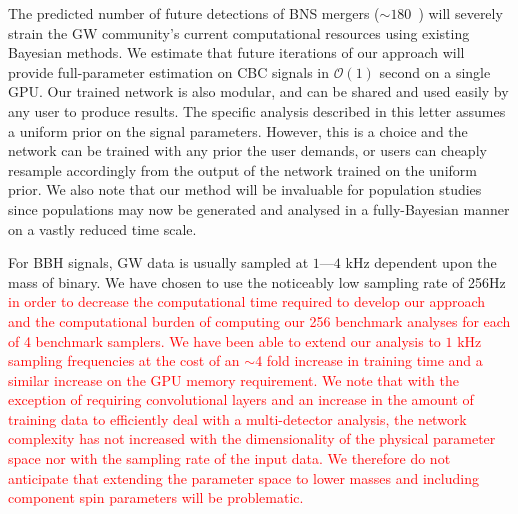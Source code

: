 \documentclass[%
showpacs,
nofootinbib,
 amsmath,amssymb,
 aps,
 twocolumn,
 prl,
 reprint,
floatfix,
]{revtex4-1}
\newcommand{\new}[1]{\textcolor{red}{#1}}
\begin{document}
%
%
The predicted number of future detections of \ac{BNS} mergers ($\sim
180$~\cite{2018LRR....21....3A}) will severely strain the \ac{GW} community's
current computational resources using existing Bayesian methods. We estimate
that future iterations of our approach will provide full-parameter estimation
on \ac{CBC} signals in $\mathcal{O}(1)$ second on a single \ac{GPU}. Our
trained network is also modular, and can be shared and used easily by any user
to produce results. The specific analysis described in this letter assumes a
uniform prior on the signal parameters. However, this is a choice and the
network can be trained with any prior the user demands, or users can cheaply
resample accordingly from the output of the network trained on the uniform
prior. We also note that our method will be invaluable for population studies
since populations may now be generated and analysed in a fully-Bayesian manner
on a vastly reduced time scale. 

%
%
For \ac{BBH} signals, \ac{GW} data is usually sampled at $1$---$4$ kHz
dependent upon the mass of binary. We have chosen to use the noticeably low
sampling rate of 256Hz \new{in order to decrease the computational time
required to develop our approach and the computational burden of computing our
256 benchmark analyses for each of 4 benchmark samplers. We have been able to
extend our analysis to $1$ kHz sampling frequencies at the cost of an $\sim4$
fold increase in training time and a similar increase on the \ac{GPU} memory
requirement. We note that with the exception of requiring convolutional layers
and an increase in the amount of training data to efficiently deal with a
multi-detector analysis, the network complexity has not increased with the
dimensionality of the physical parameter space nor with the sampling rate of
the input data. We therefore do not anticipate that extending the parameter
space to lower masses and including component spin parameters will be
problematic.} 
\end{document}
